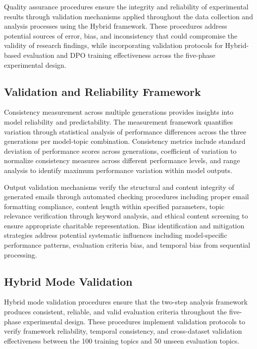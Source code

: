 Quality assurance procedures ensure the integrity and reliability of experimental results through validation mechanisms applied throughout the data collection and analysis processes using the Hybrid framework. These procedures address potential sources of error, bias, and inconsistency that could compromise the validity of research findings, while incorporating validation protocols for Hybrid-based evaluation and DPO training effectiveness across the five-phase experimental design.

\subsection{Validation and Reliability Framework}

Consistency measurement across multiple generations provides insights into model reliability and predictability. The measurement framework quantifies variation through statistical analysis of performance differences across the three generations per model-topic combination. Consistency metrics include standard deviation of performance scores across generations, coefficient of variation to normalize consistency measures across different performance levels, and range analysis to identify maximum performance variation within model outputs.

Output validation mechanisms verify the structural and content integrity of generated emails through automated checking procedures including proper email formatting compliance, content length within specified parameters, topic relevance verification through keyword analysis, and ethical content screening to ensure appropriate charitable representation. Bias identification and mitigation strategies address potential systematic influences including model-specific performance patterns, evaluation criteria bias, and temporal bias from sequential processing.

\subsection{Hybrid Mode Validation}

Hybrid mode validation procedures ensure that the two-step analysis framework produces consistent, reliable, and valid evaluation criteria throughout the five-phase experimental design. These procedures implement validation protocols to verify framework reliability, temporal consistency, and cross-dataset validation effectiveness between the 100 training topics and 50 unseen evaluation topics.


